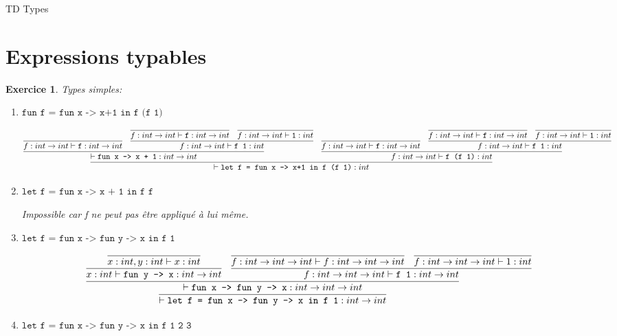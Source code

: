 \documentclass{article}
\theoremstyle{plain}
\newtheorem{exo}{Exercice}%
\begin{document}
\begin{center}
\large\sc TD Types
\end{center}

\section{Expressions typables}

\begin{exo} Types simples:
\begin{enumerate}
    \item $\texttt{fun f = fun x -> x+1 in f (f 1)}$
    
    \tiny
    \[
    \infer{\vdash\texttt{let f = fun x -> x+1 in f (f 1)}: int}
    {
      \infer{\vdash\texttt{fun x -> x + 1}: int \to int}
      {
        \infer{f:int \to int \vdash \texttt{f}: int \to int}{}&
        \infer{f:int \to int \vdash \texttt{f 1}: int}
          {
            \infer{f:int \to int \vdash \texttt{f}: int \to int}{}&
           \infer{f:int \to int \vdash \texttt{1}: int}{}
          }
      }
      & 
      \infer{f:int \to int \vdash \texttt{f (f 1)}: int}
      {
        \infer{f:int \to int \vdash \texttt{f}: int \to int}{}&
        \infer{f:int \to int \vdash \texttt{f 1}: int}
          {
            \infer{f:int \to int \vdash \texttt{f}: int \to int}{}&
            \infer{f:int \to int \vdash \texttt{1}: int}{}
          }
      }
    }
    \]
    \normalsize

  \item $\texttt{let f = fun x -> x + 1 in f f}$

    Impossible car f ne peut pas être appliqué à lui même.

  \item $\texttt{let f = fun x -> fun y -> x in f 1}$

    \tiny
    \[
      \infer{\vdash \texttt{let f = fun x -> fun y -> x in f 1}: int \to int}
        { \infer{\vdash \texttt{fun x -> fun y -> x}: int \to int \to int}
          { \infer{x : int \vdash \texttt{fun y -> x} : int \to int}
            { 
              \infer{x : int, y : int \vdash x : int}{}
            }
            &
            \infer{f : int \to int \to int \vdash \texttt{f 1} : int \to int}
            {
              \infer{f : int \to int \to int \vdash f : int \to int \to int}{}
              &
              \infer{f : int \to int \to int \vdash 1 : int}{}
            }
          }
        }
    \]
    \normalsize

  \item $\texttt{let f = fun x -> fun y -> x in f 1 2 3}$


\end{enumerate}
\end{exo}
\end{document}
